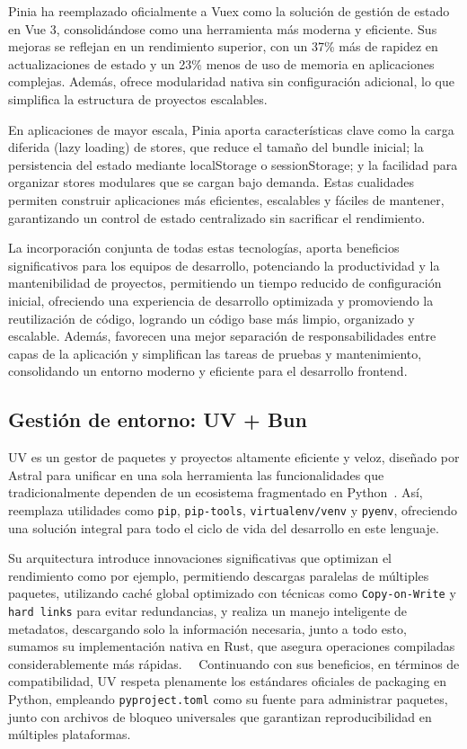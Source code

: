 Pinia ha reemplazado oficialmente a Vuex como la solución de gestión de estado en Vue 3, consolidándose como una herramienta más moderna y eficiente. Sus mejoras se reflejan en un rendimiento superior, con un 37\% más de rapidez en actualizaciones de estado y un 23\% menos de uso de memoria en aplicaciones complejas. Además, ofrece modularidad nativa sin configuración adicional, lo que simplifica la estructura de proyectos escalables.~\cite{mobilereality_vue_libs}~\cite{devto_pinia}

En aplicaciones de mayor escala, Pinia aporta características clave como la carga diferida (lazy loading) de stores, que reduce el tamaño del bundle inicial; la persistencia del estado mediante localStorage o sessionStorage; y la facilidad para organizar stores modulares que se cargan bajo demanda. Estas cualidades permiten construir aplicaciones más eficientes, escalables y fáciles de mantener, garantizando un control de estado centralizado sin sacrificar el rendimiento.~\cite{metadesign_vue_opt}

La incorporación conjunta de todas estas tecnologías, aporta beneficios significativos para los equipos de desarrollo, potenciando la productividad y la mantenibilidad de proyectos, permitiendo un tiempo reducido de configuración inicial, ofreciendo una experiencia de desarrollo optimizada y promoviendo la reutilización de código, logrando un código base más limpio, organizado y escalable. Además, favorecen una mejor separación de responsabilidades entre capas de la aplicación y simplifican las tareas de pruebas y mantenimiento, consolidando un entorno moderno y eficiente para el desarrollo frontend.

\subsection{Gestión de entorno: UV + Bun}

UV es un gestor de paquetes y proyectos altamente eficiente y veloz, diseñado por Astral para unificar en una sola herramienta las funcionalidades que tradicionalmente dependen de un ecosistema fragmentado en Python~\cite{astral_uv}. Así, reemplaza utilidades como \texttt{pip}, \texttt{pip-tools}, \texttt{virtualenv/venv} y \texttt{pyenv}, ofreciendo una solución integral para todo el ciclo de vida del desarrollo en este lenguaje.~\cite{digitalocean_uv}

Su arquitectura introduce innovaciones significativas que optimizan el rendimiento como por ejemplo, permitiendo descargas paralelas de múltiples paquetes, utilizando caché global optimizado con técnicas como \texttt{Copy-on-Write} y \texttt{hard links} para evitar redundancias, y realiza un manejo inteligente de metadatos, descargando solo la información necesaria, junto a todo esto, sumamos su implementación nativa en Rust, que asegura operaciones compiladas considerablemente más rápidas.~\cite{xebia_uv}~\cite{saaspegasus_uv} Continuando con sus beneficios, en términos de compatibilidad, UV respeta plenamente los estándares oficiales de packaging en Python, empleando \texttt{pyproject.toml} como su fuente para administrar paquetes, junto con archivos de bloqueo universales que garantizan reproducibilidad en múltiples plataformas.~\cite{pydevtools_uv}

